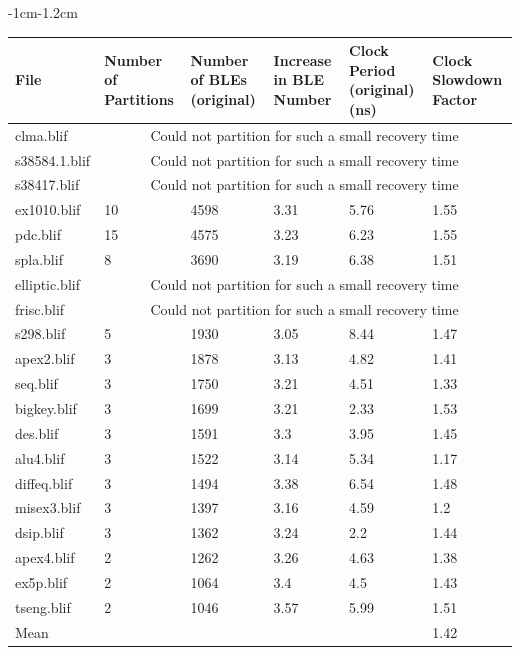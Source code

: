 \documentclass[12pt,final,oneside]{dwThesis} %
\begin{document}
   \begin{table}
      \footnotesize 
      \begin{adjustwidth}
         {-1cm}{-1.2cm}

         \begin{tabularx}
            {1.1\textwidth}{XXXXXX} \toprule File & Number of
            Partitions &  Number of BLEs (original) &  Increase in BLE
            Number &  Clock Period (original) (ns) &  Clock Slowdown
            Factor\\
            \midrule clma.blif      &  \multicolumn{5}{c}{Could not
               partition for such a small recovery time}\\
            s38584.1.blif  &
            \multicolumn{5}{c}{Could not partition for such a small recovery
               time}\\
            s38417.blif    &   \multicolumn{5}{c}{Could not
               partition for such a small recovery time}\\
            ex1010.blif    &
            10 & 4598 & 3.31 & 5.76 & 1.55\\
            pdc.blif       & 15 & 4575 &
            3.23 & 6.23 & 1.55\\
            spla.blif      & 8 & 3690 & 3.19 & 6.38 &
            1.51\\
            elliptic.blif  &  \multicolumn{5}{c}{Could not partition
               for such a small recovery time}\\
            frisc.blif &
            \multicolumn{5}{c}{Could not partition for such a small recovery
               time}\\
            s298.blif      & 5 & 1930 & 3.05 & 8.44 & 1.47\\

            apex2.blif     & 3 & 1878 & 3.13 & 4.82 & 1.41\\
            seq.blif
            & 3 & 1750 & 3.21 & 4.51 & 1.33\\
            bigkey.blif    & 3 & 1699 &
            3.21 & 2.33 & 1.53\\
            des.blif       & 3 & 1591 & 3.3 & 3.95 &
            1.45\\
            alu4.blif      & 3 & 1522 & 3.14 & 5.34 & 1.17\\

            diffeq.blif    & 3 & 1494 & 3.38 & 6.54 & 1.48\\
            misex3.blif
            & 3 & 1397 & 3.16 & 4.59 & 1.2\\
            dsip.blif      & 3 & 1362 &
            3.24 & 2.2 & 1.44\\
            apex4.blif     & 2 & 1262 & 3.26 & 4.63 &
            1.38\\
            ex5p.blif      & 2 & 1064 & 3.4 & 4.5 & 1.43\\
            tseng.blif
            & 2 & 1046 & 3.57 & 5.99 & 1.51\\
            Mean &         &           &
            &          & 1.42\\



\end{tabularx}
\end{adjustwidth}
\end{table}
\end{document}
